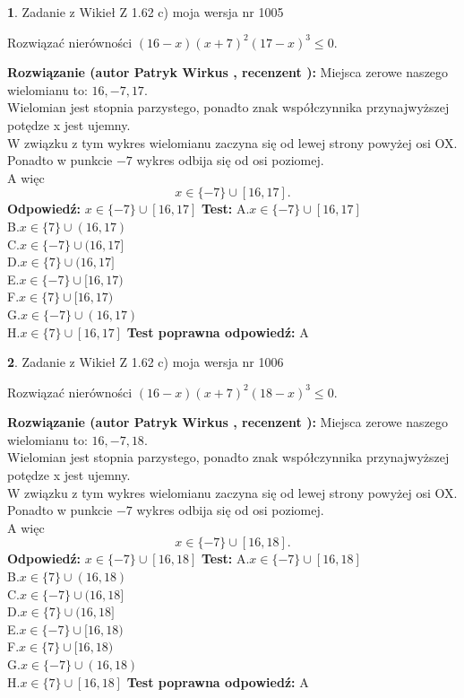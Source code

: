 \documentclass[12pt, a4paper]{article}
\theoremstyle{definition} %
\newtheorem{zad}{}
\newcommand{\zadStart}[1]{\begin{zad}#1\newline}
\newcommand{\zadStop}{\end{zad}}
\newcommand{\rozwStart}[2]{\noindent \textbf{Rozwiązanie (autor #1 , recenzent #2): }\newline}
\newcommand{\rozwStop}{\newline}
\newcommand{\odpStart}{\noindent \textbf{Odpowiedź:}\newline}
\newcommand{\odpStop}{\newline}
\newcommand{\testStart}{\noindent \textbf{Test:}\newline}
\newcommand{\testStop}{\newline}
\newcommand{\kluczStart}{\noindent \textbf{Test poprawna odpowiedź:}\newline}
\newcommand{\kluczStop}{\newline}
\begin{document}
\zadStart{Zadanie z Wikieł Z 1.62 c) moja wersja nr 1005}

Rozwiązać nierówności $(16-x)(x+7)^{2}(17-x)^{3}\le0$.
\zadStop
\rozwStart{Patryk Wirkus}{}
Miejsca zerowe naszego wielomianu to: $16, -7, 17$.\\
Wielomian jest stopnia parzystego, ponadto znak współczynnika przy\linebreak najwyższej potędze x jest ujemny.\\ W związku z tym wykres wielomianu zaczyna się od lewej strony powyżej osi OX.\\
Ponadto w punkcie $-7$ wykres odbija się od osi poziomej.\\
A więc $$x \in \{-7\} \cup [16,17].$$
\rozwStop
\odpStart
$x \in \{-7\} \cup [16,17]$
\odpStop
\testStart
A.$x \in \{-7\} \cup [16,17]$\\
B.$x \in \{7\} \cup (16,17)$\\
C.$x \in \{-7\} \cup (16,17]$\\
D.$x \in \{7\} \cup (16,17]$\\
E.$x \in \{-7\} \cup [16,17)$\\
F.$x \in \{7\} \cup [16,17)$\\
G.$x \in \{-7\} \cup (16,17)$\\
H.$x \in \{7\} \cup [16,17]$
\testStop
\kluczStart
A
\kluczStop



\zadStart{Zadanie z Wikieł Z 1.62 c) moja wersja nr 1006}

Rozwiązać nierówności $(16-x)(x+7)^{2}(18-x)^{3}\le0$.
\zadStop
\rozwStart{Patryk Wirkus}{}
Miejsca zerowe naszego wielomianu to: $16, -7, 18$.\\
Wielomian jest stopnia parzystego, ponadto znak współczynnika przy\linebreak najwyższej potędze x jest ujemny.\\ W związku z tym wykres wielomianu zaczyna się od lewej strony powyżej osi OX.\\
Ponadto w punkcie $-7$ wykres odbija się od osi poziomej.\\
A więc $$x \in \{-7\} \cup [16,18].$$
\rozwStop
\odpStart
$x \in \{-7\} \cup [16,18]$
\odpStop
\testStart
A.$x \in \{-7\} \cup [16,18]$\\
B.$x \in \{7\} \cup (16,18)$\\
C.$x \in \{-7\} \cup (16,18]$\\
D.$x \in \{7\} \cup (16,18]$\\
E.$x \in \{-7\} \cup [16,18)$\\
F.$x \in \{7\} \cup [16,18)$\\
G.$x \in \{-7\} \cup (16,18)$\\
H.$x \in \{7\} \cup [16,18]$
\testStop
\kluczStart
A
\kluczStop
\end{document}
